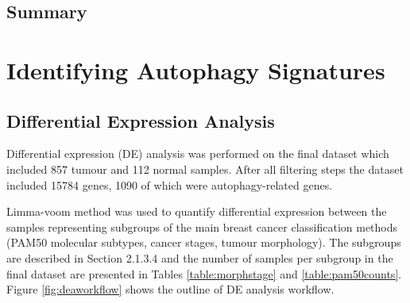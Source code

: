  
    
    
    
    


    
    
    \subsection{Summary}
    
\newpage
\section{Identifying Autophagy Signatures}

    \subsection{Differential Expression Analysis}
    
    Differential expression (DE) analysis was performed on the final dataset which included 857 tumour and 112 normal samples. After all filtering steps the dataset included 15784 genes, 1090 of which were autophagy-related genes. 

    Limma-voom method was used to quantify differential expression between the samples representing subgroups of the main breast cancer classification methods (PAM50 molecular subtypes, cancer stages, tumour morphology). The subgroups are described in Section 2.1.3.4 and the number of samples per subgroup in the final dataset are presented in Tables \ref{table:morphstage} and \ref{table:pam50counts}. Figure \ref{fig:deaworkflow} shows the outline of DE analysis workflow. 

